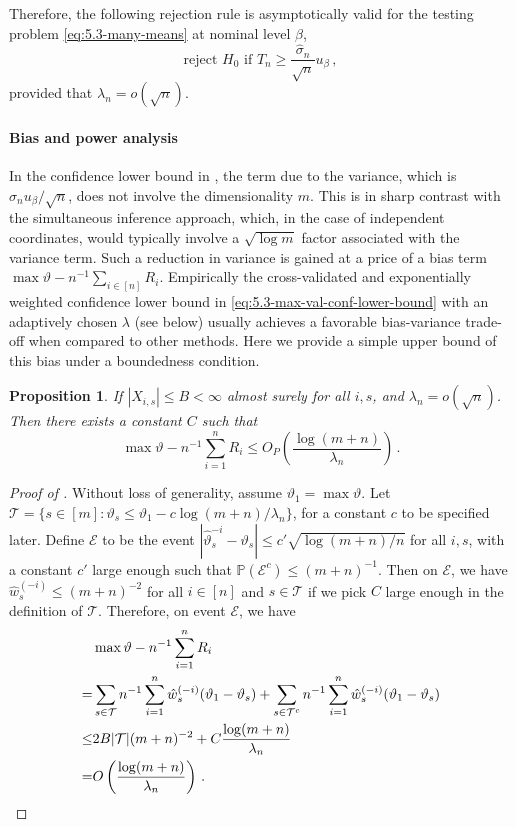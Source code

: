 \documentclass[11pt]{article}
\theoremstyle{plain}
\newtheorem{proposition}[theorem]{Proposition}
\begin{document}
Therefore, the following rejection rule is asymptotically valid for the testing problem \eqref{eq:5.3-many-means} at nominal level $\beta$,
\begin{equation}\label{eq:5.3-rej-rule}
\text{reject } H_0 \text{ if } T_n\ge \frac{\hat\sigma_n}{\sqrt{n}}u_\beta\,,
\end{equation}
provided that $\lambda_n=o(\sqrt{n})$.

\paragraph{Bias and power analysis}
    In the confidence lower bound in , the term due to the variance, which is $\hat\sigma_n u_\beta/\sqrt{n}$, does not involve the dimensionality $m$. This is in sharp contrast with the simultaneous inference approach, which, in the case of independent coordinates, would typically involve a $\sqrt{\log m}$ factor associated with the variance term.  Such a reduction in variance is gained at a price of a bias term
    $\max\vartheta - n^{-1}\sum_{i\in[n]}R_i$.  Empirically the cross-validated and exponentially weighted confidence lower bound in \eqref{eq:5.3-max-val-conf-lower-bound} with an adaptively chosen $\lambda$ (see below) usually achieves a favorable bias-variance trade-off when compared to other methods. Here we provide a simple upper bound of this bias under a boundedness condition.
\begin{proposition}\label{pro:5.3-bias}
    If $|X_{i,s}|\le B<\infty$ almost surely for all $i,s$, and $\lambda_n=o(\sqrt{n})$. Then there exists a constant $C$ such that
    $$
    \max\vartheta-n^{-1}\sum_{i=1}^n R_i\le O_P\left(\frac{\log(m+n)}{\lambda_n}\right)\,.
    $$
\end{proposition}    
    \begin{proof}
        [Proof of ]
        Without loss of generality, assume $\vartheta_1=\max\vartheta$.
        Let $\mathcal T=\{s\in[m]: \vartheta_s\le \vartheta_1-c\log(m+n)/\lambda_n\}$, for a constant $c$ to be specified later.  Define $\mathcal E$ to be the event $|\hat\vartheta_s^{-i}-\vartheta_s|\le c'\sqrt{\log(m+n)/n}$ for all $i,s$, with a constant $c'$ large enough such that $\mathbb P(\mathcal E^c)\le (m+n)^{-1}$. Then on $\mathcal E$, we have
        $\hat w_s^{(-i)}\le (m+n)^{-2}$ for all $i\in [n]$ and $s\in\mathcal T$ if we pick $C$ large enough in the definition of $\mathcal T$. Therefore, on event $\mathcal E$, we have
        \begin{align*}
            &\max\vartheta-n^{-1}\sum_{i=1}^n R_i\\
            =& \sum_{s\in\mathcal T}n^{-1}\sum_{i=1}^n \hat w_s^{(-i)}(\vartheta_1-\vartheta_s)+\sum_{s\in\mathcal T^c}n^{-1}\sum_{i=1}^n \hat w_s^{(-i)}(\vartheta_1-\vartheta_s)\\
            \le & 2B |\mathcal T|(m+n)^{-2}+C\frac{\log(m+n)}{\lambda_n}\\
            =& O\left(\frac{\log(m+n)}{\lambda_n}\right)\,. \qedhere
        \end{align*}
    \end{proof}
\end{document}
